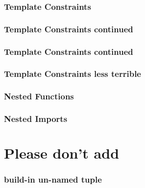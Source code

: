 \documentclass[aspectratio=169,notes]{beamer}
\begin{document}
	\begin{frame}[t]
		\frametitle{Template Constraints}
		
	\end{frame}

	\begin{frame}[t]
		\frametitle{Template Constraints continued}
		
	\end{frame}

	\begin{frame}[t]
		\frametitle{Template Constraints continued}
		
	\end{frame}

	\begin{frame}[t]
		\frametitle{Template Constraints less terrible}
		
	\end{frame}

	\begin{frame}[t]
		\frametitle{Nested Functions}
		
			
	\end{frame}

	\begin{frame}[t]
		\frametitle{Nested Imports}
		
	\end{frame}

	\section{Please don't add}

	\begin{frame}[t]
		\frametitle{build-in un-named tuple}
	\end{frame}
\end{document}
